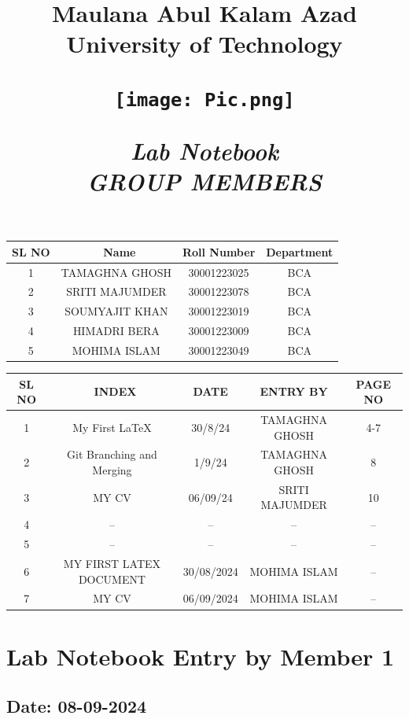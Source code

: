 \documentclass[12pt]{article}
\title{
    \vspace{0.2in}
    \Huge \textbf{Maulana Abul Kalam Azad University of Technology} \\
    \vspace{0.5in} %
    \begin{center}
        \texttt{[image: Pic.png]} %
    \end{center}
    \vspace{0.5in}
    \Huge\textbf{\textit{Lab Notebook}} \\
    \vspace{0.5in}
    \newpage
    \Large \textbf{\textit{GROUP MEMBERS}} \\
    \vspace{0.5in}
}
\date{}
\begin{document}
\maketitle

\begin{center}
    \begin{tabular}{|c| c | c | c |}
    \hline
    \textbf{SL NO}&\
    \textbf{Name} & \textbf{Roll Number} & \textbf{Department} \\
    \hline
     1 & TAMAGHNA GHOSH &30001223025 & BCA  \\
    \hline
     2& SRITI MAJUMDER & 30001223078 & BCA \\
    \hline
     3& SOUMYAJIT KHAN & 30001223019 & BCA   \\
    \hline
     4 & HIMADRI BERA & 30001223009 & BCA \\
    \hline
     5 & MOHIMA ISLAM & 30001223049 & BCA \\
    \hline
    \end{tabular}
\end{center}
\newpage
\begin{center}
    \begin{tabular}{|c|  c | c|c|c| }
    \hline
    \textbf{SL NO}&\
    \textbf{INDEX} & \textbf{DATE}&\textbf{ENTRY BY} &\textbf{PAGE NO} \\
    \hline
     1 & My First \LaTeX & 30/8/24&TAMAGHNA GHOSH & 4-7\\
    \hline
     2&Git Branching and Merging&1/9/24& TAMAGHNA GHOSH &8 \\
    \hline
     3&  MY CV & 06/09/24 & SRITI MAJUMDER & 10\\
    \hline
    4&   -- &-- &--&--\\
    5&--&--&--&--\\
    \hline
    6&MY FIRST LATEX DOCUMENT&30/08/2024&MOHIMA ISLAM&--\\
    \hline
    7&MY CV&06/09/2024&MOHIMA ISLAM&--\\
     \end{tabular}
\end{center}

\newpage

\section{Lab Notebook Entry by Member 1}
\subsection*{Date: 08-09-2024}
\end{document}
